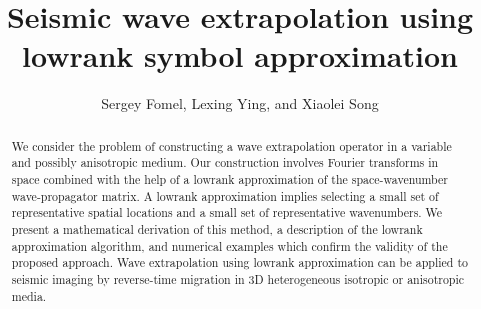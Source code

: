 
\renewcommand{\thefootnote}{\fnsymbol{footnote}}

\title{Seismic wave extrapolation using lowrank symbol approximation}
\author{Sergey Fomel\footnotemark[1], Lexing Ying\footnotemark[2], and Xiaolei Song\footnotemark[1]}



\address{
\footnotemark[1]Bureau of Economic Geology, \\
John A. and Katherine G. Jackson School of Geosciences \\
The University of Texas at Austin \\
University Station, Box X \\
Austin, TX 78713-8972 \\
USA \\
sergey.fomel@beg.utexas.edu \\
\footnotemark[2]Department of Mathematics \\
The University of Texas at Austin \\
1 University Station \\
Austin, TX 78712 \\
USA \\
lexing@math.utexas.edu
}

\maketitle

\newpage

\begin{abstract}
We consider the problem of constructing a wave extrapolation operator
in a variable and possibly anisotropic medium. Our construction
involves Fourier transforms in space combined with the help of a
lowrank approximation of the space-wavenumber wave-propagator
matrix. A lowrank approximation implies selecting a small set of
representative spatial locations and a small set of representative
wavenumbers. We present a mathematical derivation of this method, a
description of the lowrank approximation algorithm, and numerical
examples which confirm the validity of the proposed approach. Wave
extrapolation using lowrank approximation can be applied to seismic
imaging by reverse-time migration in 3D heterogeneous isotropic or
anisotropic media.
\end{abstract}

